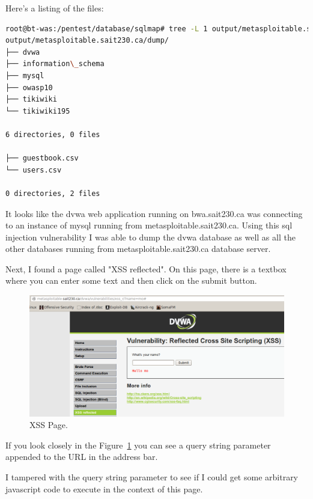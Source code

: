 \documentclass{article}
\begin{document}
Here's a listing of the files:

\begin{lstlisting}[language=Bash]
root@bt-was:/pentest/database/sqlmap# tree -L 1 output/metasploitable.sait230.ca/dump/ | less
output/metasploitable.sait230.ca/dump/
├── dvwa
├── information\_schema
├── mysql
├── owasp10
├── tikiwiki
└── tikiwiki195

6 directories, 0 files

├── guestbook.csv
└── users.csv

0 directories, 2 files

\end{lstlisting}

It looks like the dvwa web application running on bwa.sait230.ca was connecting to an
instance of mysql running from metasploitable.sait230.ca. Using this sql injection vulnerability
I was able to dump the dvwa database as well as all the other databases
running from metasploitable.sait230.ca database server.



Next, I found a page called "XSS reflected". On this page, there is a textbox where
you can enter some text and then click on the submit button.

\begin{figure}[h!]
	\includegraphics[width=\linewidth]{images/dvwa-xss-page.png}
	\caption{XSS Page.}
	\label{fig:xss-page1}
\end{figure}

If you look closely in the Figure~\ref{fig:xss-page1} you can see a 
query string parameter appended to the URL in the address bar.

I tampered with the query string parameter to see if I could get
some arbitrary javascript code to execute in the context of this
page.
\end{document}
